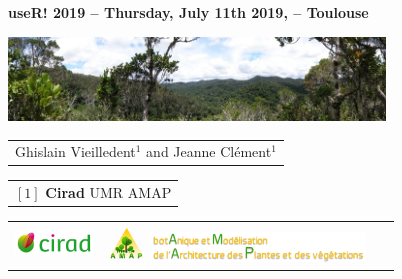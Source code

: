 

{

  \begin{frame}
    \begin{center}
      \small{\textbf{useR! 2019 --  Thursday, July 11th 2019,  -- Toulouse}}
    \end{center}
    \vspace{-0.5cm}
    \titlepage %
    \vspace{-2.5cm}
    \begin{center}
      \includegraphics[width=10cm]{figs/Banniere.png}
    \end{center}
    \begin{center}

      {\footnotesize
        \begin{tabular}{c}
          Ghislain Vieilledent$^{1}$ and 
          Jeanne Clément$^{1}$ 
        \end{tabular}
      }

      \vspace{0.25cm}

      {\scriptsize
        \begin{tabular}{c}
          $[1]$ \textbf{Cirad} UMR AMAP 
        \end{tabular}
      }

      \vspace{0.25cm}

      \begin{tabular}{C{2cm}C{2cm}C{3cm}}
        \includegraphics[height=0.7cm]{figs/Logo-Cirad.png} &
        \includegraphics[height=1cm, width=1cm]{figs/logo-AMAP.png} 
        \includegraphics[height=0.8cm]{figs/titre-long.png} &
        ~
      \end{tabular}

    \end{center}

  \end{frame}
}
